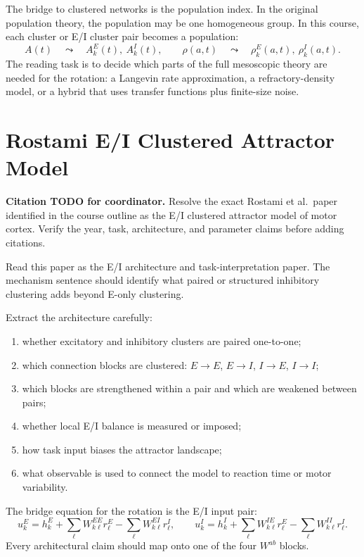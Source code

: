 The bridge to clustered networks is the population index. In the original population theory, the population may be one homogeneous group. In this course, each cluster or E/I cluster pair becomes a population:
%
\begin{equation}
  A(t)
  \quad\leadsto\quad
  A_k^E(t),\ A_k^I(t),
  \qquad
  \rho(a,t)
  \quad\leadsto\quad
  \rho_k^E(a,t),\ \rho_k^I(a,t).
  \label{eq:reading-population-to-cluster}
\end{equation}
%
The reading task is to decide which parts of the full mesoscopic theory are needed for the rotation: a Langevin rate approximation, a refractory-density model, or a hybrid that uses transfer functions plus finite-size noise.

\section{Rostami E/I Clustered Attractor Model}
\label{app:reading-rostami}

\textbf{Citation TODO for coordinator.} Resolve the exact Rostami et al.\ paper identified in the course outline as the E/I clustered attractor model of motor cortex. Verify the year, task, architecture, and parameter claims before adding citations.

Read this paper as the E/I architecture and task-interpretation paper. The mechanism sentence should identify what paired or structured inhibitory clustering adds beyond E-only clustering.

Extract the architecture carefully:
%
\begin{enumerate}[leftmargin=*]
  \item whether excitatory and inhibitory clusters are paired one-to-one;
  \item which connection blocks are clustered: $E\to E$, $E\to I$, $I\to E$, $I\to I$;
  \item which blocks are strengthened within a pair and which are weakened between pairs;
  \item whether local E/I balance is measured or imposed;
  \item how task input biases the attractor landscape;
  \item what observable is used to connect the model to reaction time or motor variability.
\end{enumerate}

The bridge equation for the rotation is the E/I input pair:
%
\begin{equation}
  u_k^E
  =
  h_k^E+\sum_{\ell}W_{k\ell}^{EE}r_{\ell}^E
  -
  \sum_{\ell}W_{k\ell}^{EI}r_{\ell}^I,
  \qquad
  u_k^I
  =
  h_k^I+\sum_{\ell}W_{k\ell}^{IE}r_{\ell}^E
  -
  \sum_{\ell}W_{k\ell}^{II}r_{\ell}^I.
  \label{eq:rostami-reading-bridge-equations}
\end{equation}
%
Every architectural claim should map onto one of the four $W^{ab}$ blocks.

